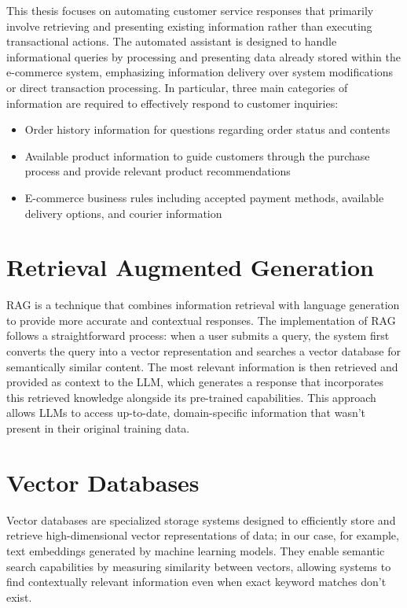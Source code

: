 This thesis focuses on automating customer service responses that primarily involve retrieving and presenting existing information rather than executing transactional actions. The automated assistant is designed to handle informational queries by processing and presenting data already stored within the e-commerce system, emphasizing information delivery over system modifications or direct transaction processing.
In particular, three main categories of information are required to effectively respond to customer inquiries:
\begin{itemize}
    \item Order history information for questions regarding order status and contents
    \item Available product information to guide customers through the purchase process and provide relevant product recommendations
    \item E-commerce business rules including accepted payment methods, available delivery options, and courier information
\end{itemize}

\section{Retrieval Augmented Generation}
\label{sec:rag}

RAG is a technique that combines information retrieval with language generation to provide more accurate and contextual responses.
The implementation of RAG follows a straightforward process: when a user submits a query, the system first converts the query into a vector representation and searches a vector database for semantically similar content.
The most relevant information is then retrieved and provided as context to the LLM, which generates a response that incorporates this retrieved knowledge alongside its pre-trained capabilities.
This approach allows LLMs to access up-to-date, domain-specific information that wasn't present in their original training data.

\section{Vector Databases}
\label{sec:vecdb}

Vector databases are specialized storage systems designed to efficiently store and retrieve high-dimensional vector representations of data; in our case, for example, text embeddings generated by machine learning models.
They enable semantic search capabilities by measuring similarity between vectors, allowing systems to find contextually relevant information even when exact keyword matches don't exist.

